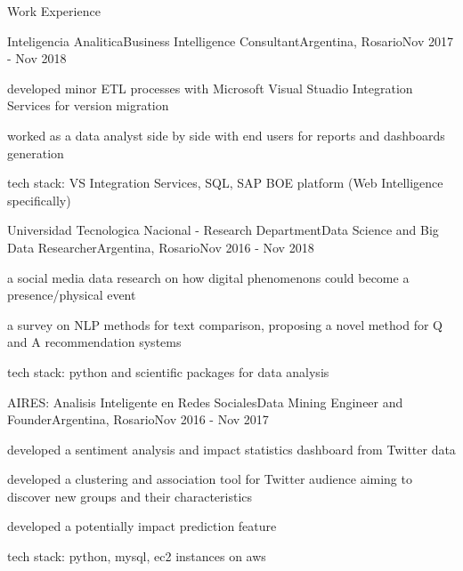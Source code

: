 \documentclass{article}
\newlength{\tabin}
\newlength{\secsep}
\newcommand{\lineunder}{\vspace*{-8pt} \\ \hspace*{-6pt} \hrulefill \\ \vspace*{-15pt}}
\newenvironment{tabbedsection}[1]{
  \begin{list}{}{
      \setlength{\itemsep}{0pt}
      \setlength{\labelsep}{0pt}
      \setlength{\labelwidth}{0pt}
      \setlength{\leftmargin}{\tabin}
      \setlength{\rightmargin}{\tabin}
      \setlength{\listparindent}{0pt}
      \setlength{\parsep}{0pt}
      \setlength{\parskip}{0pt}
      \setlength{\partopsep}{0pt}
      \setlength{\topsep}{#1}
    }
  \item[]
}{\end{list}}
\newenvironment{resume_section}[1]{
  \filbreak
  \vspace{2\secsep}
  \textsc{\large#1}
  \lineunder
  \begin{tabbedsection}{\secsep}
}{\end{tabbedsection}}
\newenvironment{subitems}{
  \renewcommand{\labelitemi}{-}
  \begin{itemize}
      \setlength{\labelsep}{1em}
}{\end{itemize}}
\newenvironment{resume_employer}[4]{
  \vspace{\secsep}
  \textbf{#1} \\ 
  \indent {\small #2} \hfill {\footnotesize#3 (#4)}
  \begin{tabbedsection}{0pt}
  \begin{subitems}
}{\end{subitems}\end{tabbedsection}}
\begin{document}
\begin{resume_section}{Work Experience}
  \begin{resume_employer}{Inteligencia Analitica}{Business Intelligence Consultant}{Argentina, Rosario}{Nov 2017 - Nov 2018}
    \item developed minor ETL processes with Microsoft Visual Stuadio Integration Services for version migration
    \item worked as a data analyst side by side with end users for reports and dashboards generation
    \item tech stack: VS Integration Services, SQL, SAP BOE platform (Web Intelligence specifically)
  \end{resume_employer}
  
  \begin{resume_employer}{Universidad Tecnologica Nacional - Research Department}{Data Science and Big Data Researcher}{Argentina, Rosario}{Nov 2016 - Nov 2018}
    \item a social media data research on how digital phenomenons could become a presence/physical event
    \item a survey on NLP methods for text comparison, proposing a novel method for Q and A recommendation systems
    \item tech stack: python and scientific packages for data analysis
  \end{resume_employer}
  
  \begin{resume_employer}{AIRES: Analisis Inteligente en Redes Sociales}{Data Mining Engineer and Founder}{Argentina, Rosario}{Nov 2016 - Nov 2017}
    \item developed a sentiment analysis and impact statistics dashboard from Twitter data 
    \item developed a clustering and association tool for Twitter audience aiming to discover new groups and their characteristics
    \item developed a potentially impact prediction feature
    \item tech stack: python, mysql, ec2 instances on aws
  \end{resume_employer}  
\end{resume_section}
\end{document}
